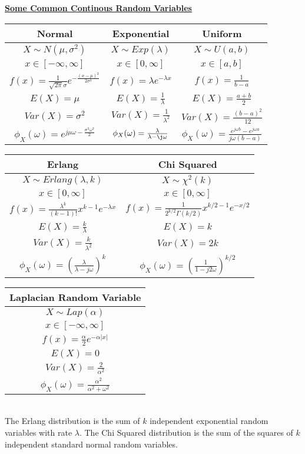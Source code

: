 \documentclass[12pt]{article}
\author{Lawrence Liu}
\begin{document}
\underline{\textbf{Some Common Continous Random Variables}}\\
\begin{tabular}{ | c| c | c |}
Normal & Exponential & Uniform \\
\hline
$X\sim N(\mu,\sigma^2)$ & $X\sim Exp(\lambda)$ & $X\sim U(a,b)$ \\

$x\in [-\infty ,\infty]$ & $x\in [0,\infty]$ & $x\in [a,b]$ \\

$f(x)=\frac{1}{\sqrt{2\pi}\sigma}e^{-\frac{(x-\mu)^2}{2\sigma^2}}$ & $f(x)=\lambda e^{-\lambda x}$ & $f(x)=\frac{1}{b-a}$ \\

$E(X)=\mu$ & $E(X)=\frac{1}{\lambda}$ & $E(X)=\frac{a+b}{2}$\\

$Var(X)=\sigma^2$ & $Var(X)=\frac{1}{\lambda^2}$ & $Var(X)=\frac{(b-a)^2}{12}$\\
$\phi_X(\omega)=e^{j\mu\omega-\frac{\sigma^2\omega^2}{2}}$ & $\phi_X(\omega)=\frac{\lambda}{\lambda-\j\omega}$ & $\phi_X(\omega)=\frac{e^{j\omega b}-e^{j\omega a}}{j\omega(b-a)}$\\
\hline
\end{tabular}
\begin{tabular}{ | c| c |}
    Erlang & Chi Squared\\
    \hline
    $X\sim Erlang(\lambda,k)$ & $X\sim \chi^2(k)$\\
    $x\in [0,\infty]$ & $x\in [0,\infty]$\\
    $f(x)=\frac{\lambda^k}{(k-1)!}x^{k-1}e^{-\lambda x}$ & $f(x)=\frac{1}{2^{k/2}\Gamma(k/2)}x^{k/2-1}e^{-x/2}$\\
    $E(X)=\frac{k}{\lambda}$ & $E(X)=k$\\
    $Var(X)=\frac{k}{\lambda^2}$ & $Var(X)=2k$\\
    $\phi_X(\omega)=\left(\frac{\lambda}{\lambda-j\omega}\right)^k$ & $\phi_X(\omega)=\left(\frac{1}{1-j2\omega}\right)^{k/2}$\\
    \hline
\end{tabular}
\begin{tabular}{|c|}
    Laplacian Random Variable\\
    \hline
    $X\sim Lap(\alpha)$\\
    $x\in [-\infty ,\infty]$\\
    $f(x)=\frac{\alpha}{2}e^{-\alpha|x|}$\\
    $E(X)=0$\\
    $Var(X)=\frac{2}{\alpha^2}$\\
    $\phi_X(\omega)=\frac{\alpha^2}{\alpha^2+\omega^2}$\\
    \hline
\end{tabular}\\
The Erlang distribution is the sum of
$k$ independent exponential random variables with rate $\lambda$.
The Chi Squared distribution is the sum of the squares of $k$ independent standard normal random variables.
\end{document}
